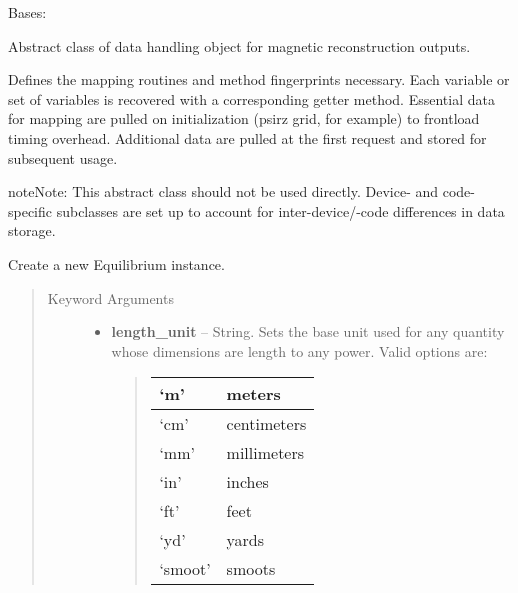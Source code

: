\documentclass[letterpaper,10pt,english]{sphinxmanual}
\begin{document}
\begin{fulllineitems}
\label{eqtools:eqtools.core.Equilibrium}
Bases: 

Abstract class of data handling object for magnetic reconstruction outputs.

Defines the mapping routines and method fingerprints necessary.
Each variable or set of variables is recovered with a corresponding
getter method. Essential data for mapping are pulled on initialization
(psirz grid, for example) to frontload timing overhead. Additional data
are pulled at the first request and stored for subsequent usage.

\begin{notice}{note}{Note:}
This abstract class should not be used directly. Device- and code-
specific subclasses are set up to account for inter-device/-code differences
in data storage.
\end{notice}

Create a new Equilibrium instance.
\begin{quote}\begin{description}
\item[{Keyword Arguments}] \leavevmode\begin{itemize}
\item {} 
\textbf{length\_unit} --
String.
Sets the base unit used for any quantity whose
dimensions are length to any power. Valid options are:
\begin{quote}

\begin{tabulary}{\linewidth}{|L|L|}
\hline

`m'
 & 
meters
\\\hline

`cm'
 & 
centimeters
\\\hline

`mm'
 & 
millimeters
\\\hline

`in'
 & 
inches
\\\hline

`ft'
 & 
feet
\\\hline

`yd'
 & 
yards
\\\hline

`smoot'
 & 
smoots
\\\hline


\end{tabulary}
\end{quote}
\end{itemize}
\end{description}
\end{quote}
\end{fulllineitems}
\end{document}
